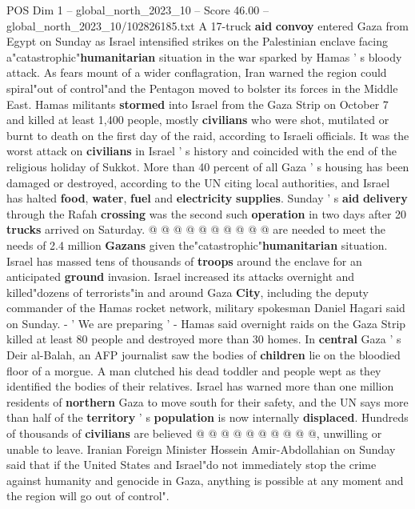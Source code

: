 \begin{textsample}{POS Dim 1 – global\_north\_2023\_10 – Score 46.00 – global\_north\_2023\_10/102826185.txt}  \label{ex:f1_pos_313}
A 17-truck \textbf{aid} \textbf{convoy} entered Gaza from Egypt on Sunday as Israel intensified strikes on the Palestinian enclave facing a"catastrophic"\textbf{humanitarian} situation in the war sparked by Hamas ' s bloody attack.
As fears mount of a wider conflagration, Iran warned the region could spiral"out of control"and the Pentagon moved to bolster its forces in the Middle East.
Hamas militants \textbf{stormed} into Israel from the Gaza Strip on October 7 and killed at least 1,400 people, mostly \textbf{civilians} who were shot, mutilated or burnt to death on the first day of the raid, according to Israeli officials.
It was the worst attack on \textbf{civilians} in Israel ' s history and coincided with the end of the religious holiday of Sukkot.
More than 40 percent of all Gaza ' s housing has been damaged or destroyed, according to the UN citing local authorities, and Israel has halted \textbf{food}, \textbf{water}, \textbf{fuel} and \textbf{electricity} \textbf{supplies}.
Sunday ' s \textbf{aid} \textbf{delivery} through the Rafah \textbf{crossing} was the second such \textbf{operation} in two days after 20 \textbf{trucks} arrived on Saturday. @ @ @ @ @ @ @ @ @ @ are needed to meet the needs of 2.4 million \textbf{Gazans} given the"catastrophic"\textbf{humanitarian} situation.
Israel has massed tens of thousands of \textbf{troops} around the enclave for an anticipated \textbf{ground} invasion.
Israel increased its attacks overnight and killed"dozens of terrorists"in and around Gaza \textbf{City}, including the deputy commander of the Hamas rocket network, military spokesman Daniel Hagari said on Sunday. - ' We are preparing ' - Hamas said overnight raids on the Gaza Strip killed at least 80 people and destroyed more than 30 homes.
In \textbf{central} Gaza ' s Deir al-Balah, an AFP journalist saw the bodies of \textbf{children} lie on the bloodied floor of a morgue.
A man clutched his dead toddler and people wept as they identified the bodies of their relatives.
Israel has warned more than one million residents of \textbf{northern} Gaza to move south for their safety, and the UN says more than half of the \textbf{territory} ' s \textbf{population} is now internally \textbf{displaced}.
Hundreds of thousands of \textbf{civilians} are believed @ @ @ @ @ @ @ @ @ @, unwilling or unable to leave.
Iranian Foreign Minister Hossein Amir-Abdollahian on Sunday said that if the United States and Israel"do not immediately stop the crime against humanity and genocide in Gaza, anything is possible at any moment and the region will go out of control".

\end{textsample}
